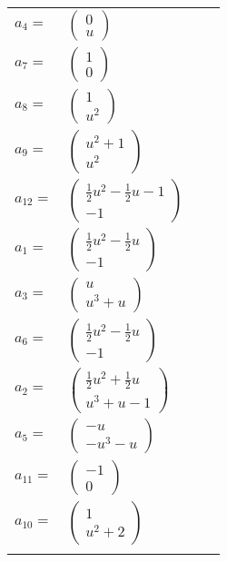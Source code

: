 \documentclass[1p]{elsarticle_modified}
\theoremstyle{definition}
\begin{document}
\begin{tabular}{m{7pt} m{180pt} m{7pt} m{180pt} }
\flushright $a_{4}=$&$\begin{pmatrix}0\\u\end{pmatrix}$ \\
\flushright $a_{7}=$&$\begin{pmatrix}1\\0\end{pmatrix}$ \\
\flushright $a_{8}=$&$\begin{pmatrix}1\\u^2\end{pmatrix}$ \\
\flushright $a_{9}=$&$\begin{pmatrix}u^2+1\\u^2\end{pmatrix}$ \\
\flushright $a_{12}=$&$\begin{pmatrix}\frac{1}{2} u^2-\frac{1}{2} u-1\\-1\end{pmatrix}$ \\
\flushright $a_{1}=$&$\begin{pmatrix}\frac{1}{2} u^2-\frac{1}{2} u\\-1\end{pmatrix}$ \\
\flushright $a_{3}=$&$\begin{pmatrix}u\\u^3+u\end{pmatrix}$ \\
\flushright $a_{6}=$&$\begin{pmatrix}\frac{1}{2} u^2-\frac{1}{2} u\\-1\end{pmatrix}$ \\
\flushright $a_{2}=$&$\begin{pmatrix}\frac{1}{2} u^2+\frac{1}{2} u\\u^3+u-1\end{pmatrix}$ \\
\flushright $a_{5}=$&$\begin{pmatrix}- u\\- u^3- u\end{pmatrix}$ \\
\flushright $a_{11}=$&$\begin{pmatrix}-1\\0\end{pmatrix}$ \\
\flushright $a_{10}=$&$\begin{pmatrix}1\\u^2+2\end{pmatrix}$\\&\end{tabular}
\end{document}
